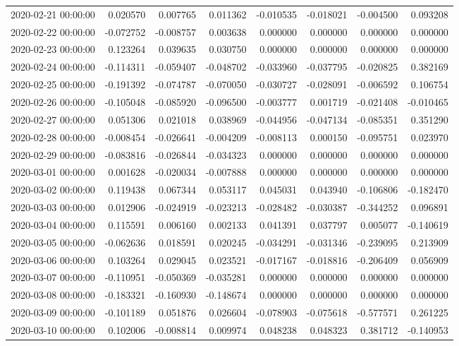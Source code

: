 \begin{tabular}{lrrrrrrr}
2020-02-21 00:00:00 & 0.020570 & 0.007765 & 0.011362 & -0.010535 & -0.018021 & -0.004500 & 0.093208 \\
2020-02-22 00:00:00 & -0.072752 & -0.008757 & 0.003638 & 0.000000 & 0.000000 & 0.000000 & 0.000000 \\
2020-02-23 00:00:00 & 0.123264 & 0.039635 & 0.030750 & 0.000000 & 0.000000 & 0.000000 & 0.000000 \\
2020-02-24 00:00:00 & -0.114311 & -0.059407 & -0.048702 & -0.033960 & -0.037795 & -0.020825 & 0.382169 \\
2020-02-25 00:00:00 & -0.191392 & -0.074787 & -0.070050 & -0.030727 & -0.028091 & -0.006592 & 0.106754 \\
2020-02-26 00:00:00 & -0.105048 & -0.085920 & -0.096500 & -0.003777 & 0.001719 & -0.021408 & -0.010465 \\
2020-02-27 00:00:00 & 0.051306 & 0.021018 & 0.038969 & -0.044956 & -0.047134 & -0.085351 & 0.351290 \\
2020-02-28 00:00:00 & -0.008454 & -0.026641 & -0.004209 & -0.008113 & 0.000150 & -0.095751 & 0.023970 \\
2020-02-29 00:00:00 & -0.083816 & -0.026844 & -0.034323 & 0.000000 & 0.000000 & 0.000000 & 0.000000 \\
2020-03-01 00:00:00 & 0.001628 & -0.020034 & -0.007888 & 0.000000 & 0.000000 & 0.000000 & 0.000000 \\
2020-03-02 00:00:00 & 0.119438 & 0.067344 & 0.053117 & 0.045031 & 0.043940 & -0.106806 & -0.182470 \\
2020-03-03 00:00:00 & 0.012906 & -0.024919 & -0.023213 & -0.028482 & -0.030387 & -0.344252 & 0.096891 \\
2020-03-04 00:00:00 & 0.115591 & 0.006160 & 0.002133 & 0.041391 & 0.037797 & 0.005077 & -0.140619 \\
2020-03-05 00:00:00 & -0.062636 & 0.018591 & 0.020245 & -0.034291 & -0.031346 & -0.239095 & 0.213909 \\
2020-03-06 00:00:00 & 0.103264 & 0.029045 & 0.023521 & -0.017167 & -0.018816 & -0.206409 & 0.056909 \\
2020-03-07 00:00:00 & -0.110951 & -0.050369 & -0.035281 & 0.000000 & 0.000000 & 0.000000 & 0.000000 \\
2020-03-08 00:00:00 & -0.183321 & -0.160930 & -0.148674 & 0.000000 & 0.000000 & 0.000000 & 0.000000 \\
2020-03-09 00:00:00 & -0.101189 & 0.051876 & 0.026604 & -0.078903 & -0.075618 & -0.577571 & 0.261225 \\
2020-03-10 00:00:00 & 0.102006 & -0.008814 & 0.009974 & 0.048238 & 0.048323 & 0.381712 & -0.140953 \\

\end{tabular}
